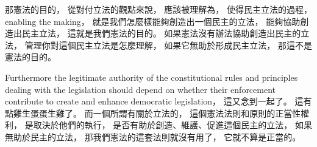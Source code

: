 \hypertarget{w02:cue:197}{}那憲法的目的，
\hypertarget{w02:cue:198}{}從對付立法的觀點來說，
\hypertarget{w02:cue:199}{}應該被理解為，
\hypertarget{w02:cue:200}{}使得民主立法的過程，
\hypertarget{w02:cue:201}{}enabling the making，
\hypertarget{w02:cue:202}{}就是我們怎麼樣能夠創造出一個民主的立法，
\hypertarget{w02:cue:203}{}能夠協助創造出民主立法，
\hypertarget{w02:cue:204}{}這就是我們憲法的目的。
\hypertarget{w02:cue:205}{}如果憲法沒有辦法協助創造出民主的立法，
\hypertarget{w02:cue:206}{}管理你對這個民主立法是怎麼理解，
\hypertarget{w02:cue:207}{}如果它無助於形成民主立法，
\hypertarget{w02:cue:208}{}那這不是憲法的目的。

\hypertarget{w02:cue:209}{}Furthermore
\hypertarget{w02:cue:210}{}the legitimate authority of the constitutional rules and principles dealing with the legislation
\hypertarget{w02:cue:211}{}should depend on whether their enforcement contribute to create and enhance democratic legislation，
\hypertarget{w02:cue:212}{}這又念到一起了。
\hypertarget{w02:cue:213}{}這有點雞生蛋蛋生雞了。
\hypertarget{w02:cue:214}{}而一個所謂有關於立法的，
\hypertarget{w02:cue:215}{}這個憲法法則和原則的正當性權利，
\hypertarget{w02:cue:216}{}是取決於他們的執行，
\hypertarget{w02:cue:217}{}是否有助於創造、維護、促進這個民主的立法，
\hypertarget{w02:cue:218}{}如果無助於民主的立法，
\hypertarget{w02:cue:219}{}那我們憲法的這套法則就沒有用了，
\hypertarget{w02:cue:220}{}它就不算是正當的。


